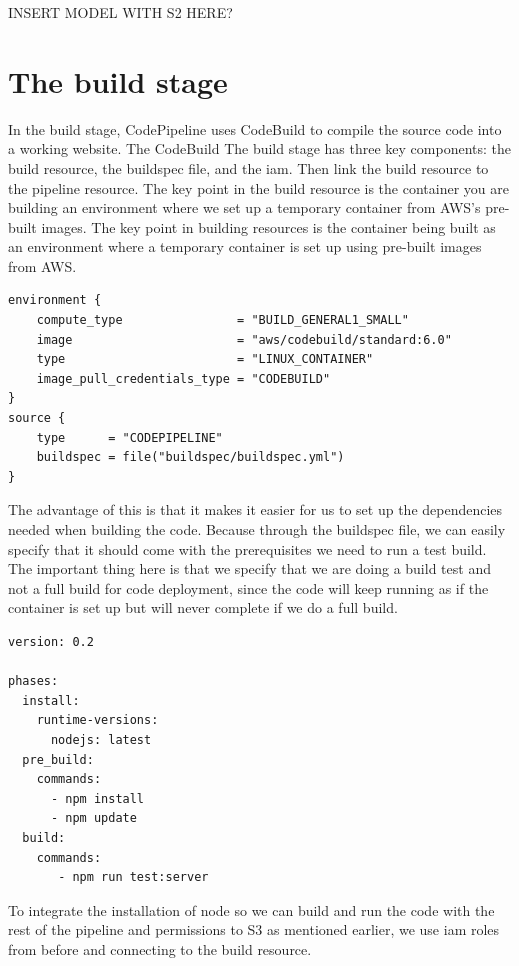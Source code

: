 INSERT MODEL WITH S2 HERE?

\section{The build stage}
In the build stage, CodePipeline uses CodeBuild to compile the source code into a working website. The CodeBuild 
The build stage has three key components: the build resource, the \gls{buildspec} file, and the \acrshort{iam}. Then link the build resource to the pipeline resource. The key point in the build resource is the container you are building an environment where we set up a temporary container from AWS's pre-built images. The key point in building resources is the container being built as an environment where a temporary container is set up using pre-built images from AWS. 


\begin{tcolorbox}
\begin{verbatim}  
environment {
    compute_type                = "BUILD_GENERAL1_SMALL"
    image                       = "aws/codebuild/standard:6.0"
    type                        = "LINUX_CONTAINER"
    image_pull_credentials_type = "CODEBUILD"
}
source {
    type      = "CODEPIPELINE"
    buildspec = file("buildspec/buildspec.yml")
}
\end{verbatim}
\end{tcolorbox}

The advantage of this is that it makes it easier for us to set up the dependencies needed when building the code. Because through the \gls{buildspec} file, we can easily specify that it should come with the prerequisites we need to run a test build. The important thing here is that we specify that we are doing a build test and not a full build for code deployment, since the code will keep running as if the container is set up but will never complete if we do a full build.
\begin{tcolorbox}
\begin{verbatim}
version: 0.2

phases:
  install:
    runtime-versions:
      nodejs: latest
  pre_build:
    commands:
      - npm install
      - npm update
  build:
    commands:
       - npm run test:server
\end{verbatim}
\end{tcolorbox}

To integrate the installation of node so we can build and run the code with the rest of the pipeline and permissions to S3 as mentioned earlier, we use \acrshort{iam} roles from before and connecting to the build resource.

